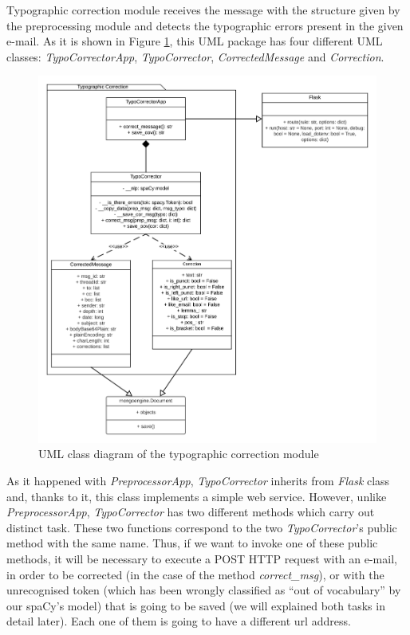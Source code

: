 Typographic correction module receives the message with the structure given by the preprocessing module and detects the typographic errors present in the given e-mail. As it is shown in Figure \ref{fig:umltypo}, this UML package has four different UML classes: \textit{TypoCorrectorApp}, \textit{TypoCorrector}, \textit{CorrectedMessage} and \textit{Correction}.

\begin{figure}[p]
	\centering%
	\centerline{\includegraphics[width=0.9\paperwidth]{Imagenes/Bitmap/typoUML.png}}%
	\caption{UML class diagram of the typographic correction module}%
	\label{fig:umltypo}
\end{figure}

As it happened with \textit{PreprocessorApp}, \textit{TypoCorrector} inherits from \textit{Flask} class and, thanks to it, this class implements a simple web service. However, unlike \textit{PreprocessorApp}, \textit{TypoCorrector} has two different methods which carry out distinct task. These two functions correspond to the two \textit{TypoCorrector}'s public method with the same name. Thus, if we want to invoke one of these public methods, it will be necessary to execute a POST HTTP request with an e-mail, in order to be corrected (in the case of the method \textit{correct\_msg}), or with the unrecognised token (which has been wrongly classified as ``out of vocabulary'' by our spaCy's model) that is going to be saved (we will explained both tasks in detail later). Each one of them is going to have a different url address.

